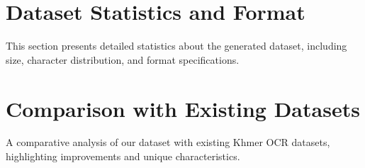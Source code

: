 \section{Dataset Statistics and Format}
\label{sec:statistics}
This section presents detailed statistics about the generated dataset, including size, character distribution, and format specifications.

\section{Comparison with Existing Datasets}
\label{sec:comparison}
A comparative analysis of our dataset with existing Khmer OCR datasets, highlighting improvements and unique characteristics.
